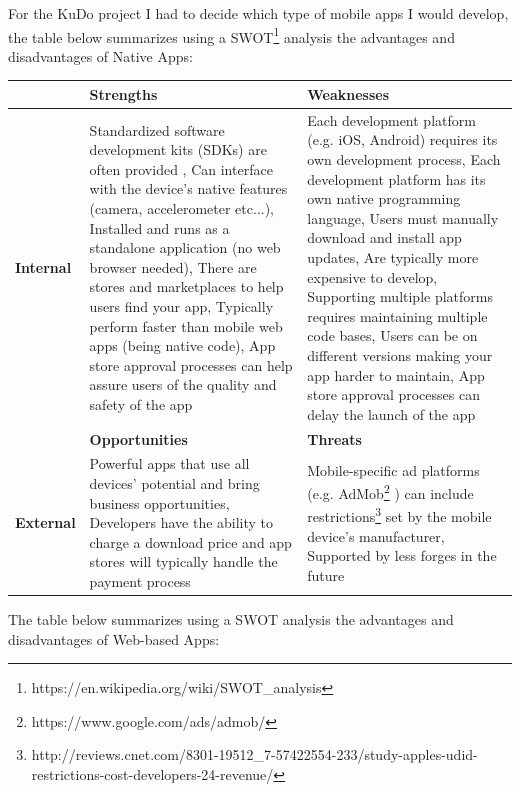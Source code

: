 \documentclass[a4paper,12pt]{book}
\begin{document}
For the KuDo project I had to decide which type of mobile apps I would develop, the table below summarizes using a SWOT\footnote{https://en.wikipedia.org/wiki/SWOT\_analysis} analysis the advantages and disadvantages of Native Apps:

\begin{center}
    \begin{tabular}{ | p{1.7cm} | p{6cm} | p{6cm} |}
    \hline
    & \textbf{Strengths} & \textbf{Weaknesses} \\ \hline
    \textbf{Internal} & 
    Standardized software development kits (SDKs) are often provided , %
    Can interface with the device’s native features (camera, accelerometer etc...),
    Installed and runs as a standalone application (no web browser needed),
    There are stores and marketplaces to help users find your app,
    Typically perform faster than mobile web apps (being native code),
    App store approval processes can help assure users of the quality and safety of the app
    & Each development platform (e.g. iOS, Android) requires its own development process, %
    Each development platform has its own native programming language, 
    Users must manually download and install app updates,
    Are typically more expensive to develop,
    Supporting multiple platforms requires maintaining multiple code bases,
    Users can be on different versions making your app harder to maintain,
    App store approval processes can delay the launch of the app\\ \hline
    & \textbf{Opportunities} & \textbf{Threats} \\ \hline
    \textbf{External}  
    & Powerful apps that use all devices' potential and bring business opportunities, %
    Developers have the ability to charge a download price and app stores will typically handle the payment process
    & Mobile-specific ad platforms (e.g. AdMob\footnote{https://www.google.com/ads/admob/} ) can include restrictions\footnote{http://reviews.cnet.com/8301-19512\_7-57422554-233/study-apples-udid-restrictions-cost-developers-24-revenue/}  set by the mobile device’s manufacturer, %
    Supported by less forges in the future\\ \hline
    \end{tabular}
\end{center}

The table below summarizes using a SWOT analysis the advantages and disadvantages of Web-based Apps:
\end{document}
